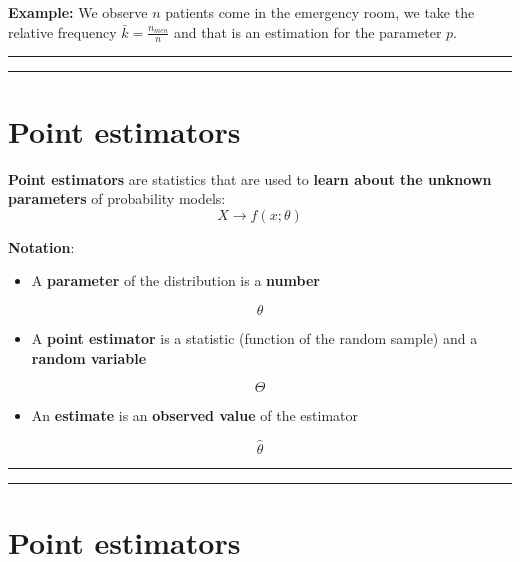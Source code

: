 \documentclass[
]{book}
\providecommand{\tightlist}{%
  \setlength{\itemsep}{0pt}\setlength{\parskip}{0pt}}
\begin{document}
\textbf{Example:} We observe \(n\) patients come in the emergency room, we take the relative frequency \(\bar{k}=\frac{n_{men}}{n}\) and that is an estimation for the parameter \(p\).

\begin{center}\rule{0.5\linewidth}{0.5pt}\end{center}

\begin{center}\rule{0.5\linewidth}{0.5pt}\end{center}

\hypertarget{point-estimators-1}{%
\section{Point estimators}\label{point-estimators-1}}

\textbf{Point estimators} are statistics that are used to \textbf{learn about the unknown parameters} of probability models:
\[X \rightarrow f(x; \theta)\]

\textbf{Notation}:

\begin{itemize}
\tightlist
\item
  A \textbf{parameter} of the distribution is a \textbf{number}
\end{itemize}

\[\theta\]

\begin{itemize}
\tightlist
\item
  A \textbf{point estimator} is a statistic (function of the random sample) and a \textbf{random variable}
\end{itemize}

\[\Theta\]

\begin{itemize}
\tightlist
\item
  An \textbf{estimate} is an \textbf{observed value} of the estimator
\end{itemize}

\[\hat{\theta}\]

\begin{center}\rule{0.5\linewidth}{0.5pt}\end{center}

\begin{center}\rule{0.5\linewidth}{0.5pt}\end{center}

\hypertarget{point-estimators-2}{%
\section{Point estimators}\label{point-estimators-2}}
\end{document}
